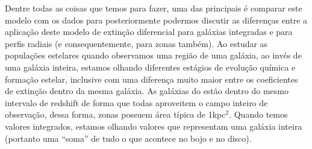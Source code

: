 Dentre todas as coisas que temos para fazer, uma das principais é comparar este modelo com os dados
para posteriormente podermos discutir as diferenças entre a aplicação deste modelo de extinção
diferencial para galáxias integradas e para perfis radiais (e consequentemente, para zonas também).
Ao estudar as populações estelares quando observamos uma região de uma galáxia, ao invés de uma
galáxia inteira, estamos olhando diferentes estágios de evolução química e formação estelar,
inclusive com uma diferença muito maior entre os coeficientes de extinção dentro da mesma galáxia.
As galáxias do \CAL estão dentro do mesmo intervalo de redshift de forma que todas aproveitem o
campo inteiro de observação, dessa forma, zonas possuem área típica de 1kpc${}^2$. Quando temos
valores integrados, estamos olhando valores que representam uma galáxia inteira (portanto uma
``soma'' de tudo o que acontece no bojo e no disco).


